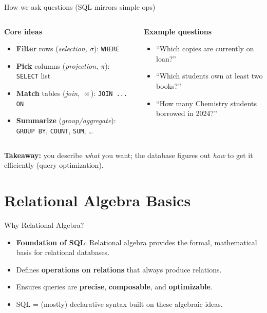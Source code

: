 \documentclass{beamer}
\begin{document}
\begin{frame}{How we ask questions (SQL mirrors simple ops)}
\begin{columns}[T,onlytextwidth]
\begin{column}{0.55\linewidth}
\textbf{Core ideas}
\begin{itemize}
  \item \textbf{Filter} rows (\emph{selection, $\sigma$}): \texttt{WHERE}
  \item \textbf{Pick} columns (\emph{projection, $\pi$}): \texttt{SELECT} list
  \item \textbf{Match} tables (\emph{join, $\bowtie$}): \texttt{JOIN ... ON}
  \item \textbf{Summarize} (\emph{group/aggregate}): \texttt{GROUP BY}, \texttt{COUNT}, \texttt{SUM}, \dots
\end{itemize}
\end{column}
\begin{column}{0.45\linewidth}
\textbf{Example questions}
\begin{itemize}
  \item “Which copies are currently on loan?”
  \item “Which students own at least two books?”
  \item “How many Chemistry students borrowed in 2024?”
\end{itemize}
\end{column}
\end{columns}
\vspace{0.6em}
\textbf{Takeaway:} you describe \emph{what} you want; the database figures out \emph{how} to get it efficiently (query optimization).
\end{frame}

\section{Relational Algebra Basics}

\begin{frame}{Why Relational Algebra?}
\begin{itemize}
  \item \textbf{Foundation of SQL}: Relational algebra provides the formal, mathematical basis for relational databases.
  \item Defines \textbf{operations on relations} that always produce relations.
  \item Ensures queries are \textbf{precise}, \textbf{composable}, and \textbf{optimizable}.
  \item SQL = (mostly) declarative syntax built on these algebraic ideas.
\end{itemize}
\end{frame}
\end{document}
